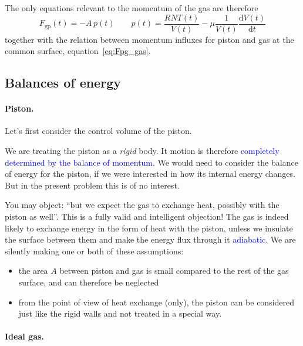 \documentclass[a4paper,12pt,%
onecolumn,oneside,titlepage,%
british%
]{memoir}
\newcommand*{\di}{\mathrm{d}}%
\renewcommand*{\|}[1][]{\nonscript\:#1\vert\nonscript\:\mathopen{}}
\newcommand*{\sect}{\S}%
\renewcommand*{\autoref}[2]{\sidepar{\vspace{-1ex}\footnotesize{\color{blue}\faIcon{%
reply%
}\enspace\sect\,\ref{#1} page\,\pageref{#1}}}\textcolor{blue}{#2}}
\newcommand*{\ypr}{p}
\newcommand*{\yN}{N}
\newcommand*{\yFgp}{F_{\text{gp}}}
\newcommand*{\yvis}{\mu}%
\newcommand*{\yte}{T}%
\begin{document}
\medskip

The only equations relevant to the momentum of the gas are therefore
\begin{equation}
  \label{eq:gas_top_F}
  \yFgp(t) = -A\,\ypr(t)
  \qquad
  \ypr(t) = \frac{R \yN \yte(t)}{V(t)}  - \yvis \frac{1}{V(t)}\frac{\di V(t)}{\di t}
\end{equation}
together  with the relation between momentum influxes for piston and gas at the common surface, equation~\eqref{eq:Fpg_gas}.

\subsection{Balances of energy}
\label{sec:idealgas_ex_energy}

\paragraph{Piston.} Let's first consider the control volume of the piston.

We are treating the piston as a \emph{rigid} body. It motion is therefore \autoref{sec:rigid_bodies}{completely determined by the balance of momentum}. We would need to consider the balance of energy for the piston, if we were interested in how its internal energy changes. But in the present problem this is of no interest.

You may object: \enquote{but we expect the gas to exchange heat, possibly with the piston as well}. This is a fully valid and intelligent objection! The gas is indeed likely to exchange energy in the form of heat with the piston, unless we insulate the surface between them and make the energy flux through it \autoref{def:heatflux_adiabatic}{adiabatic}. We are silently making one or both of these assumptions:
\begin{itemize}
\item the area $A$ between piston and gas is small compared to the rest of the gas surface, and can therefore be neglected
\item from the point of view of heat exchange (only), the piston can be considered just like the rigid walls and not treated in a special way.
\end{itemize}

\bigskip

\paragraph{Ideal gas.}
\end{document}
